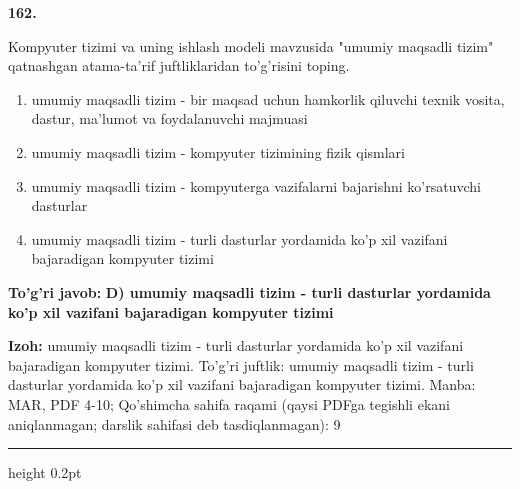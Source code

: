 \documentclass[10pt,a4paper]{article}
\begin{document}
{\bfseries\sffamily\color{ink} 162.}
\par
Kompyuter tizimi va uning ishlash modeli mavzusida "umumiy maqsadli tizim" qatnashgan atama-ta'rif juftliklaridan to'g'risini toping.
\begin{enumerate}[label=\Alph*),leftmargin=9mm]
\item umumiy maqsadli tizim - bir maqsad uchun hamkorlik qiluvchi texnik vosita, dastur, ma'lumot va foydalanuvchi majmuasi
\item umumiy maqsadli tizim - kompyuter tizimining fizik qismlari
\item umumiy maqsadli tizim - kompyuterga vazifalarni bajarishni ko'rsatuvchi dasturlar
\item umumiy maqsadli tizim - turli dasturlar yordamida ko'p xil vazifani bajaradigan kompyuter tizimi
\end{enumerate}
\begin{tcolorbox}[enhanced,breakable,colback=teal!4,colframe=teal!60!black,boxrule=0.45pt,arc=1.2mm,left=2.7mm,right=2.7mm,top=1.8mm,bottom=1.8mm,before skip=2mm,after skip=2mm]
{\bfseries\sffamily\color{teal}To'g'ri javob:} \textbf{D) umumiy maqsadli tizim - turli dasturlar yordamida ko'p xil vazifani bajaradigan kompyuter tizimi}
\par\smallskip
{\bfseries Izoh:} umumiy maqsadli tizim - turli dasturlar yordamida ko'p xil vazifani bajaradigan kompyuter tizimi. To'g'ri juftlik: umumiy maqsadli tizim - turli dasturlar yordamida ko'p xil vazifani bajaradigan kompyuter tizimi. Manba: MAR, PDF 4-10; Qo'shimcha sahifa raqami (qaysi PDFga tegishli ekani aniqlanmagan; darslik sahifasi deb tasdiqlanmagan): 9
\end{tcolorbox}
\vspace{2mm}\hrule height 0.2pt\vspace{3mm}
\end{document}
